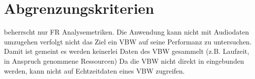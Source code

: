 \section{Abgrenzungskriterien}
\setcounter{counterKriterien}{0}
 \projektTitel beherrscht nur \gls{FR} Analysemetriken.
 Die Anwendung kann nicht mit Audiodaten umzugehen
 \projektTitel verfolgt nicht das Ziel ein \gls{VBW} auf seine Performanz zu untersuchen. Damit ist gemeint es werden keinerlei Daten des \gls{VBW} gesammelt (z.B. Laufzeit, in Anspruch genommene Ressourcen)
 Da die \gls{VBW} nicht direkt in \projektTitel eingebunden
			werden, kann \projektTitel nicht auf Echtzeitdaten eines \gls{VBW} zugreifen.

